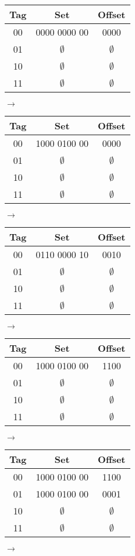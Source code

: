 \documentclass{exam}
\begin{document}
\begin{questions}
\begin{tabular}{c|c|c}
\textbf{Tag}&\textbf{Set}&\textbf{Offset}\\ [0.5ex] 
 \hline\hline
00&0000  0000 00&0000\\
01&$\emptyset$&$\emptyset$\\
10&$\emptyset$&$\emptyset$\\
11&$\emptyset$&$\emptyset$\\
\end{tabular} $\longrightarrow$
\begin{tabular}{c|c|c}
\textbf{Tag}&\textbf{Set}&\textbf{Offset}\\ [0.5ex] 
 \hline\hline
00&1000 0100 00&0000\\
01&$\emptyset$&$\emptyset$\\
10&$\emptyset$&$\emptyset$\\
11&$\emptyset$&$\emptyset$\\
\end{tabular} $\longrightarrow$
\begin{tabular}{c|c|c}
\textbf{Tag}&\textbf{Set}&\textbf{Offset}\\ [0.5ex] 
 \hline\hline
00&0110 0000 10&0010\\
01&$\emptyset$&$\emptyset$\\
10&$\emptyset$&$\emptyset$\\
11&$\emptyset$&$\emptyset$\\
\end{tabular} $\longrightarrow$
\begin{tabular}{c|c|c}
\textbf{Tag}&\textbf{Set}&\textbf{Offset}\\ [0.5ex] 
 \hline\hline
00&1000 0100 00 &1100\\
01&$\emptyset$&$\emptyset$\\
10&$\emptyset$&$\emptyset$\\
11&$\emptyset$&$\emptyset$\\
\end{tabular} $\longrightarrow$
\begin{tabular}{c|c|c}
\textbf{Tag}&\textbf{Set}&\textbf{Offset}\\ [0.5ex] 
 \hline\hline
00&1000 0100 00 &1100\\
01&1000 0100 00&0001\\
10&$\emptyset$&$\emptyset$\\
11&$\emptyset$&$\emptyset$\\
\end{tabular} $\longrightarrow$
\begin{tabular}{c|c|c}

\end{tabular}
\end{questions}
\end{document}
